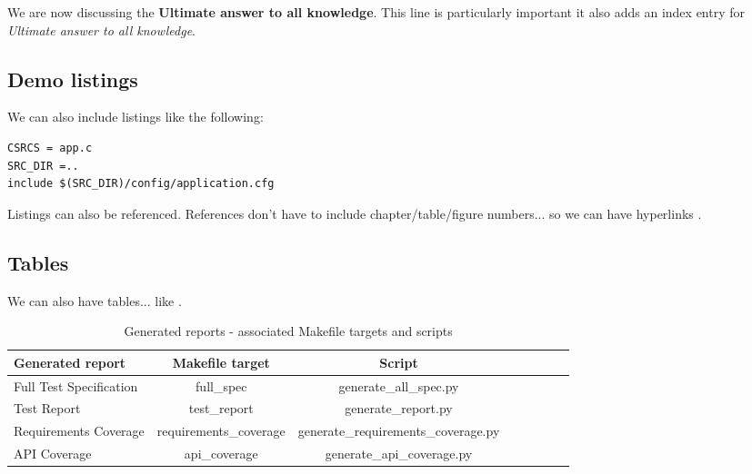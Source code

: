We are now discussing the \textbf{Ultimate answer to all knowledge}.
This line is particularly important it also adds an index entry for \textit{Ultimate answer to all knowledge}.

\subsection{Demo listings}

We can also include listings like the following:

\lstset{language=make,caption=Application Makefile,label=lst:app-make}
\begin{lstlisting}
CSRCS = app.c
SRC_DIR =..
include $(SRC_DIR)/config/application.cfg
\end{lstlisting}

Listings can also be referenced. References don't have to include chapter/table/figure numbers... so we can have hyperlinks .

\subsection{Tables}

We can also have tables... like .

\begin{center}
\begin{table}[htb]
  \caption{Generated reports - associated Makefile targets and scripts}
  \begin{tabular}{l*{6}{c}r}
    Generated report & Makefile target & Script \\
    \hline
    Full Test Specification & full_spec & generate_all_spec.py  \\
    Test Report & test_report & generate_report.py  \\
    Requirements Coverage & requirements_coverage &
    generate_requirements_coverage.py   \\
    API Coverage & api_coverage & generate_api_coverage.py  \\
  \end{tabular}
  \label{table:reports}
\end{table}
\end{center}
